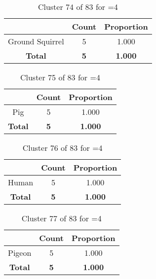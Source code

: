 \begin{table}[ht!]
\centering
\begin{tabular}{|c|c|c|}
\hline
\bf \Spec{} &\bf Count &\bf Proportion\\ \hline \hline
Ground Squirrel & 5 & 1.000\\ \hline
\hline
\bf Total & \bf 5 & \bf 1.000\\ \hline
\end{tabular}
\label{tab:cluster:74:4}
\caption{Cluster 74 of 83 for \minneigh{}=4}
\end{table}

\begin{table}[ht!]
\centering
\begin{tabular}{|c|c|c|}
\hline
\bf \Spec{} &\bf Count &\bf Proportion\\ \hline \hline
Pig & 5 & 1.000\\ \hline
\hline
\bf Total & \bf 5 & \bf 1.000\\ \hline
\end{tabular}
\label{tab:cluster:75:4}
\caption{Cluster 75 of 83 for \minneigh{}=4}
\end{table}

\begin{table}[ht!]
\centering
\begin{tabular}{|c|c|c|}
\hline
\bf \Spec{} &\bf Count &\bf Proportion\\ \hline \hline
Human & 5 & 1.000\\ \hline
\hline
\bf Total & \bf 5 & \bf 1.000\\ \hline
\end{tabular}
\label{tab:cluster:76:4}
\caption{Cluster 76 of 83 for \minneigh{}=4}
\end{table}

\begin{table}[ht!]
\centering
\begin{tabular}{|c|c|c|}
\hline
\bf \Spec{} &\bf Count &\bf Proportion\\ \hline \hline
Pigeon & 5 & 1.000\\ \hline
\hline
\bf Total & \bf 5 & \bf 1.000\\ \hline
\end{tabular}
\label{tab:cluster:77:4}
\caption{Cluster 77 of 83 for \minneigh{}=4}
\end{table}

